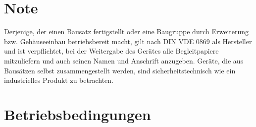 \documentclass[fleqn,10pt]{SelfArx} %
\begin{document}
\flushbottom %

\maketitle %

\tableofcontents %

\thispagestyle{empty} %


\section*{Note} %


Derjenige, der einen Bausatz fertigstellt oder eine Baugruppe durch Erweiterung bzw. Gehäuseeinbau betriebsbereit macht, gilt nach DIN VDE 0869 als Hersteller und ist verpflichtet, bei der Weitergabe des Gerätes alle Begleitpapiere mitzuliefern und auch seinen Namen und Anschrift anzugeben. Geräte, die aus Bausätzen selbst zusammengestellt werden, sind sicherheitstechnisch wie ein industrielles Produkt zu betrachten.


\section{Betriebsbedingungen}
\end{document}
